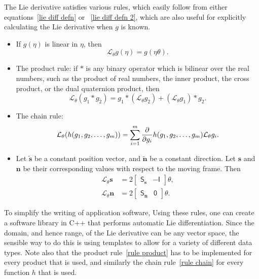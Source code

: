 \documentclass[reqno,12pt]{amsart}
\newcommand\starop[1]{\mathsf S_{#1}}
\newcommand{\liederiv}{\mathcal L}
\begin{document}
The Lie derivative satisfies various rules, which easily follow from either equations~\eqref{lie diff defn} or ~\eqref{lie diff defn 2}, which are also useful for explicitly calculating the Lie derivative when $g$ is known.
\begin{itemize}
\item If $g(\eta)$ is linear in $\eta$, then
\begin{equation}
\label{rule linear}
\liederiv_\theta g(\eta) = g(\eta \theta).
\end{equation}
\item The product rule: if $*$ is any binary operator which is bilinear over the real numbers, such as the product of real numbers, the inner product, the cross product,
or the dual quaternion product, then
\begin{equation}
\label{rule product}
\liederiv_\theta (g_1 * g_2) = g_1 * (\liederiv_\theta g_2) + (\liederiv_\theta g_1) * g_2.
\end{equation}
\item The chain rule:
\begin{equation}
\label{rule chain}
\liederiv_\theta (h(g_1, g_2,\dots,g_m)) \\ = \sum_{i=1}^m
\frac\partial{\partial g_i} h(g_1, g_2,\dots,g_m) \liederiv_\theta g_i .
\end{equation}
\item
Let $\tilde{\bm s}$ be a constant position vector, and $\tilde{\bm n}$ be a constant direction.  Let $\bm s$ and $\bm n$ be their corresponding values with respect to the moving frame.  Then
\begin{align}
\label{lie deriv vector 1}
\mathcal L_\theta \bm s &= 2 \begin{bmatrix} \starop{\bm s} & - \mathsf I \end{bmatrix} \theta , \\
\label{lie deriv vector 2}
\mathcal L_\theta \bm n &= 2 \begin{bmatrix} \starop{\bm n} & \mathsf 0 \end{bmatrix} \theta .
\end{align}
\end{itemize}
To simplify the writing of application software, Using these rules, one can create a software library in C++ that performs automatic Lie differentiation.  Since the domain, and hence range, of the Lie derivative can be any vector space, the sensible way to do this is using templates to allow for a variety of different data types.  Note also that the product rule~\eqref{rule product} has to be implemented for every product that is used, and similarly the chain rule~\eqref{rule chain} for every function $h$ that is used.
\end{document}
